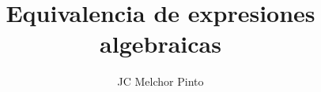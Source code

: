 \documentclass[12pt,addpoints,answers]{guia}
\title{Equivalencia de expresiones algebraicas}
\author{JC Melchor Pinto}
\begin{document}
\pagestyle{headandfoot}

\INFO
\begin{questions}
    \questionboxed[18]{}
    \questionboxed[16]{}
    \questionboxed[10]{}
    \questionboxed[16]{}
    \questionboxed[20]{}
    \questionboxed[20]{}
\end{questions}
\end{document}
